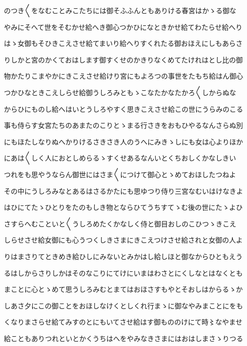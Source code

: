\documentclass[a4paper,11pt,landscape]{ltjtarticle}
\begin{document}
\par\medskip
のつき〱をなむことみこたちには御そふふんともありける春宮はかゝる御な
\par\medskip
やみにそへて世をそむかせ給へき御心つかひになときかせ給てわたらせ給へり
\par\medskip
はゝ女御もそひきこえさせ給てまいり給へりすくれたる御おほえにしもあらさ
\par\medskip
りしかと宮のかくておはします御すくせのかきりなくめてたけれはとし比の御
\par\medskip
物かたりこまやかにきこえさせ給けり宮にもよろつの事世をたもち給はん御心
\par\medskip
つかひなときこえしらせ給御うしろみともゝこなたかなたかろ〱しからぬな
\par\medskip
からひにものし給へはいとうしろやすく思きこえさせ給この世にうらみのこる
\par\medskip
事も侍らす女宮たちのあまたのこりとゝまる行さきをおもひやるなんさらぬ別
\par\medskip
にもほたしなりぬへかりけるさきさき人のうへにみきゝしにも女は心よりほか
\par\medskip
にあは〱しく人におとしめらるゝすくせあるなんいとくちおしくかなしきい
\par\medskip
つれをも思やうならん御世にはさま〱につけて御心とゝめておほしたつねよ
\par\medskip
その中にうしろみなとあるはさるかたにも思ゆつり侍り三宮なむいはけなきよ
\par\medskip
はひにてたゝひとりをたのもしき物とならひてうちすてゝむ後の世にたゝよひ
\par\medskip
さすらへむこといと〱うしろめたくかなしく侍と御目おしのこひつゝきこえ
\par\medskip
しらせさせ給女御にも心うつくしきさまにきこえつけさせ給されと女御の人よ
\par\medskip
りはまさりてときめき給ひしにみないとみかはし給しほと御なからひともえう
\par\medskip
るはしからさりしかはそのなこりにてけにいまはわさとにくしなとはなくとも
\par\medskip
まことに心とゝめて思うしろみむとまてはおほさすもやとそおしはからるゝか
\par\medskip
しあさ夕にこの御ことをおほしなけくとしくれ行まゝに御なやみまことにをも
\par\medskip
くなりまさらせ給てみすのとにもいてさせ給はす御もののけにて時〻なやませ
\par\medskip
給こともありつれといとかくうちはへをやみなきさまにはおはしまさゝりつる
\par\medskip
\end{document}
